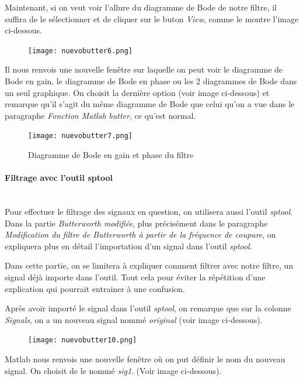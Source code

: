 \documentclass[conference,onecolumn]{IEEEtran}
\begin{document}
Maintenant, si on veut voir l'allure du diagramme de Bode de notre filtre, il suffira de le sélectionner et de cliquer sur le buton \textit{View}, comme le montre l'image ci-dessous.

\begin{figure}[H]
 \centering
    \texttt{[image: nuevobutter6.png]}
\end{figure}

Il nous renvois une nouvelle fenêtre sur laquelle on peut voir le diagramme de Bode en gain, le diagramme de Bode en phase ou les 2 diagrammes de Bode dans un seul graphique. On choisit la dernière option (voir image ci-dessous) et remarque qu'il s'agit du même diagramme de Bode que celui qu'on a vue dans le paragraphe \textit{Fonction Matlab butter}, ce qu’est normal.

\begin{figure}[H]
 \centering
    \texttt{[image: nuevobutter7.png]}
    \caption{Diagramme de Bode en gain et phase du filtre}
\end{figure}

\paragraph{Filtrage avec l'outil sptool}
\hfill \\ 

Pour effectuer le filtrage des signaux en question, on utilisera aussi l’outil \textit{sptool}. Dans la partie \textit{Butterworth modifiée}, plus précisément dans le paragraphe \textit{ Modification du filtre de Butterworth à partir de la fréquence de coupure}, on expliquera plus en détail l’importation d’un signal dans l’outil \textit{sptool}.

Dans cette partie, on se limitera à expliquer comment filtrer avec notre filtre, un signal déjà importe dans l’outil. Tout cela pour éviter la répétition d’une explication qui pourrait entrainer à une confusion. 

Après avoir importé le signal dans l’outil \textit{sptool}, on remarque que sur la colonne \textit{Signals}, on a un nouveau signal nommé \textit{original} (voir image ci-dessous). 

\begin{figure}[H]
 \centering
    \texttt{[image: nuevobutter10.png]}
\end{figure}

Matlab nous renvois une nouvelle fenêtre où on put définir le nom du nouveau signal. On choisit de le nommé \textit{sig1}. (Voir image ci-dessous).
\end{document}
